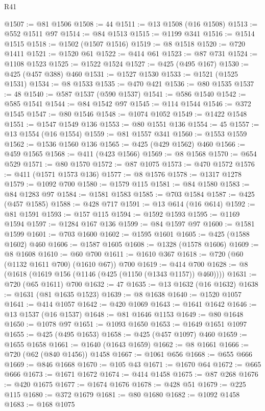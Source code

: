 \begin{lexlean}{R41}
\begin{coremodule}
{{{{{{{{{{{{{{{{{{{{{{{{{{{{{{{{{{{{{{{{{{{{{{{{{{{{{{{{{{{{{{{{{{{{{{{{{{{{{{{{{{{{{{{@1507 := @81 @1506
@1508 := 44
@1511 := @13 @1508 (@16 @1508)
@1513 := @552 @1511 @97
@1514 := @84 @1513
@1515 := @1199 @341
@1516 := @1514 @1515
@1518 := @1502 (@1507 @1516)
@1519 := @8 @1518
@1520 := @720 @1411
@1521 := @1520 @61
@1522 := @414 @61
@1523 := @87 @731
@1524 := @1108 @1523
@1525 := @1522 @1524
@1527 := @425 (@495 @167)
@1530 := @425 (@457 @388) @460
@1531 := @1527 @1530
@1533 := @1521 (@1525 @1531)
@1534 := @8 @1533
@1535 := @470 @421
@1536 := @80 @1535
@1537 := 48
@1540 := @587 @1537 (@590 @1537)
@1541 := @586 @1540
@1542 := @585 @1541
@1544 := @84 @1542 @97
@1545 := @114 @1544
@1546 := @372 @1545
@1547 := @80 @1546
@1548 := @1074 @1052
@1549 := @1422 @1548
@1551 := @1547 @1549 @136
@1553 := @80 @1551 @136
@1554 := 45
@1557 := @13 @1554 (@16 @1554)
@1559 := @81 @1557 @341
@1560 := @1553 @1559
@1562 := @1536 @1560 @136
@1565 := @425 (@429 @1562) @460
@1566 := @459 @1565
@1568 := @411 (@423 @1566)
@1569 := @8 @1568
@1570 := @654 @529
@1571 := @80 @1570
@1572 := @87 @1075
@1573 := @470 @1572
@1576 := @411 (@1571 @1573 @136)
@1577 := @8 @1576
@1578 := @1317 @1278
@1579 := @1092 @700
@1580 := @1579 @115
@1581 := @84 @1580
@1583 := @84 @1283 @97
@1584 := @1581 @1583
@1585 := @703 @1584
@1587 := @425 (@457 @1585)
@1588 := @428 @717
@1591 := @13 @614 (@16 @614)
@1592 := @81 @1591
@1593 := @157 @115
@1594 := @1592 @1593
@1595 := @1169 @1594
@1597 := @1284 @167 @136
@1599 := @84 @1597 @97
@1600 := @1581 @1599
@1601 := @703 @1600
@1602 := @1595 @1601
@1605 := @425 (@1588 @1602) @460
@1606 := @1587 @1605
@1608 := @1328 (@1578 @1606)
@1609 := @8 @1608
@1610 := @60 @700
@1611 := @1610 @367
@1618 := @720 (@60 (@1132 @1611 @700) (@1610 @67)) @700
@1619 := @414 @700
@1628 := @8 (@1618 (@1619 @156 (@1146 (@425 (@1150 (@1343 @1157)) @460))))
@1631 := @720 (@65 @1611) @700
@1632 := 47
@1635 := @13 @1632 (@16 @1632)
@1638 := @1631 (@81 @1635 @1523)
@1639 := @8 @1638
@1640 := @1520 @1057
@1641 := @414 @1057
@1642 := @420 @1069
@1643 := @1641 @1642
@1646 := @13 @1537 (@16 @1537)
@1648 := @81 @1646 @1153
@1649 := @80 @1648
@1650 := @1078 @97
@1651 := @1093 @1650
@1653 := @1649 @1651 @1097
@1655 := @425 (@495 @1653)
@1658 := @425 (@457 @1097) @460
@1659 := @1655 @1658
@1661 := @1640 (@1643 @1659)
@1662 := @8 @1661
@1666 := @720 (@62 (@840 @1456)) @1458
@1667 := @1061 @656
@1668 := @655 @666
@1669 := @846 @1668
@1670 := @105 @43
@1671 := @1670 @64
@1672 := @665 @666
@1673 := @1671 @1672
@1674 := @414 @1458
@1675 := @87 @268
@1676 := @420 @1675
@1677 := @1674 @1676
@1678 := @428 @51
@1679 := @225 @115
@1680 := @372 @1679
@1681 := @80 @1680
@1682 := @1092 @1458
@1683 := @168 @1075
}}}}}}}}}}}}}}}}}}}}}}}}}}}}}}}}}}}}}}}}}}}}}}}}}}}}}}}}}}}}}}}}}}}}}}}}}}}}}}}}}}}}}}}
\end{coremodule}
\end{lexlean}
